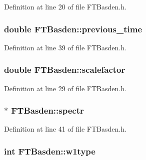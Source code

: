 Definition at line 20 of file FTBasden.h.

\hypertarget{classFTBasden_ab76d8343edad3ec52f4677b4b0444027}{
\subsubsection[{previous\_\-time}]{\setlength{\rightskip}{0pt plus 5cm}double {\bf FTBasden::previous\_\-time}}}
\label{classFTBasden_ab76d8343edad3ec52f4677b4b0444027}


Definition at line 39 of file FTBasden.h.

\hypertarget{classFTBasden_a0ce6d1dfd48295970fae36c2fd66c7c0}{
\subsubsection[{scalefactor}]{\setlength{\rightskip}{0pt plus 5cm}double {\bf FTBasden::scalefactor}}}
\label{classFTBasden_a0ce6d1dfd48295970fae36c2fd66c7c0}


Definition at line 29 of file FTBasden.h.

\hypertarget{classFTBasden_aed5e060486471328c4b0cb30b828d242}{
\subsubsection[{spectr}]{$\ast$ {\bf FTBasden::spectr}}}
\label{classFTBasden_aed5e060486471328c4b0cb30b828d242}


Definition at line 41 of file FTBasden.h.

\hypertarget{classFTBasden_abebf10bcdc72528f9c98459e91524545}{
\subsubsection[{w1type}]{\setlength{\rightskip}{0pt plus 5cm}int {\bf FTBasden::w1type}}}
\label{classFTBasden_abebf10bcdc72528f9c98459e91524545}


